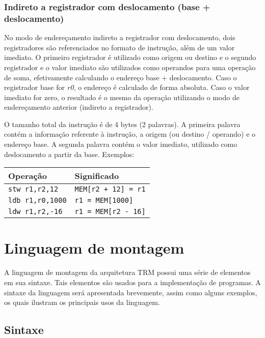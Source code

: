 \documentclass[11pt,a4paper]{report}
\begin{document}
\subsection{Indireto a registrador com deslocamento (base + deslocamento)}

No modo de endereçamento indireto a registrador com deslocamento, dois
registradores são referenciados no formato de instrução, além de um valor
imediato. O primeiro registrador é utilizado como origem ou destino
e o segundo registrador e o valor imediato são utilizados como operandos
para uma operação de soma, efetivamente calculando o endereço base + 
deslocamento. Caso o registrador base for \textit{r0}, o endereço é
calculado de forma absoluta. Caso o valor imediato for zero, o resultado
é o mesmo da operação utilizando o modo de endereçamento anterior
(indireto a registrador). 

O tamanho total da instrução é de 4 bytes (2 palavras). A primeira
palavra contém a informação referente à instrução, a origem (ou destino
/ operando) e o endereço base. A segunda palavra contém o valor imediato,
utilizado como deslocamento a partir da base. Exemplos:

\begin{table}[htb!]
\centering
\begin{tabular}{|p{5.0cm}|p{8.0cm}|}
\hline
\bf{Operação} & \bf{Significado} \\ \hline \hline
\texttt{stw r1,r2,12} & \verb|MEM[r2 + 12] = r1| \\ \hline
\texttt{ldb r1,r0,1000} & \verb|r1 = MEM[1000]| \\ \hline
\texttt{ldw r1,r2,-16} & \verb|r1 = MEM[r2 - 16]| \\ \hline
\end{tabular}
\end{table}


\chapter{Linguagem de montagem}

A linguagem de montagem da arquitetura TRM possui uma série de elementos
em sua sintaxe. Tais elementos são usados para a implementação de
programas. A sintaxe da linguagem será apresentada brevemente, assim como
alguns exemplos, os quais ilustram os principais usos da linguagem.

\section{Sintaxe}
\end{document}
